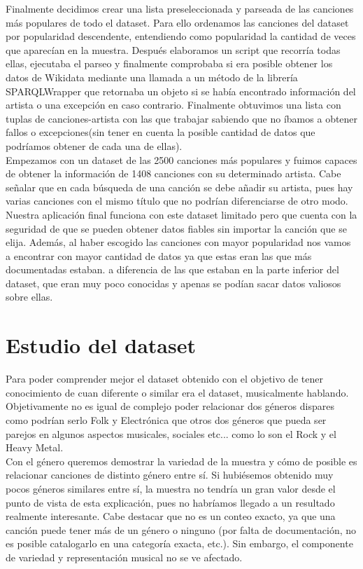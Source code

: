 Finalmente decidimos crear una lista preseleccionada y parseada de las canciones más populares de todo el dataset. Para ello ordenamos las canciones del dataset por popularidad descendente, entendiendo como popularidad la cantidad de veces que aparecían en la muestra. Después elaboramos un script que recorría todas ellas, ejecutaba el parseo y finalmente comprobaba si era posible obtener los datos de Wikidata mediante una llamada a un método de la librería SPARQLWrapper que retornaba un objeto si se había encontrado información del artista o una excepción en caso contrario. Finalmente obtuvimos una lista con tuplas de canciones-artista con las que trabajar sabiendo que no íbamos a obtener fallos o excepciones(sin tener en cuenta la posible cantidad de datos que podríamos obtener de cada una de ellas).\\

Empezamos con un dataset de las 2500 canciones más populares y fuimos capaces de obtener la información de 1408 canciones con su determinado artista. Cabe señalar que en cada búsqueda de una canción se debe añadir su artista, pues hay varias canciones con el mismo título que no podrían diferenciarse de otro modo.\\

Nuestra aplicación final funciona con este dataset limitado pero que cuenta con la seguridad de que se pueden obtener datos fiables sin importar la canción que se elija. Además, al haber escogido las canciones con mayor popularidad nos vamos a encontrar con mayor cantidad de datos ya que estas eran las que más documentadas estaban. a diferencia de las que estaban en la parte inferior del dataset, que eran muy poco conocidas y apenas se podían sacar datos valiosos sobre ellas.

\section{Estudio del dataset}

Para poder comprender mejor el dataset obtenido con el objetivo de tener conocimiento de cuan diferente o similar era el dataset, musicalmente hablando. Objetivamente no es igual de complejo poder relacionar dos géneros dispares como podrían serlo Folk y Electrónica que otros dos géneros que pueda ser parejos en algunos aspectos musicales, sociales etc... como lo son el Rock y el Heavy Metal.\\

Con el género queremos demostrar la variedad de la muestra y cómo de posible es relacionar canciones de distinto género entre sí. Si hubiésemos obtenido muy pocos géneros similares entre sí, la muestra no tendría un gran valor desde el punto de vista de esta explicación, pues no habríamos llegado a un resultado realmente interesante. Cabe destacar que no es un conteo exacto, ya que una canción puede tener más de un género o ninguno (por falta de documentación, no es posible catalogarlo en una categoría exacta, etc.). Sin embargo, el componente de variedad y representación musical no se ve afectado.

